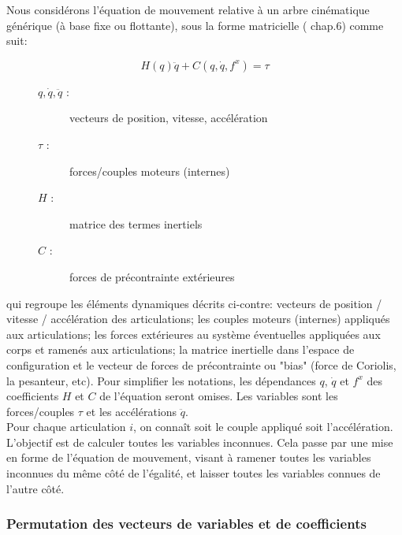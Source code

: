 \documentclass{report}
\begin{document}
Nous considérons l'équation de mouvement relative à un arbre cinématique générique (à base fixe ou flottante), sous la forme matricielle (\cite{bib_featherstone} chap.6) comme suit:

\begin{equation} \label{equ_equationMvt}
H(q)\ddot{q} + C(q,\dot{q},f^x) = \tau
\end{equation}

\medskip

\begin{figure}
  \begin{flushright}
  \begin{minipage}[t]{0.45\textwidth}
  \begin{description}
    \item[$q, \dot{q}, \ddot{q}$ :] vecteurs de position, vitesse, accélération
    \item[$\tau$ :] forces/couples moteurs (internes)
    \item[$H$ :] matrice des termes inertiels
    \item[$C$ :] forces de précontrainte extérieures
  \end{description}
  \end{minipage}
  \end{flushright}
\end{figure}

qui regroupe les éléments dynamiques décrits ci-contre: vecteurs de position / vitesse / accélération des articulations; les couples moteurs (internes) appliqués aux articulations; les forces extérieures au système éventuelles appliquées aux corps et ramenés aux articulations; la matrice inertielle dans l'espace de configuration et le vecteur de forces de précontrainte ou "bias" (force de Coriolis, la pesanteur, etc).
Pour simplifier les notations, les dépendances $q$, $\dot{q}$ et $f^x$ des coefficients $H$ et $C$ de l'équation seront omises. Les variables sont les forces/couples $\tau$ et les accélérations $\ddot{q}$.\\
Pour chaque articulation $i$, on connaît soit le couple appliqué soit l'accélération. L'objectif est de calculer toutes les variables inconnues. Cela passe par une mise en forme de l'équation de mouvement, visant à ramener toutes les variables inconnues du même côté de l'égalité, et laisser toutes les variables connues de l'autre côté.

\subsubsection{Permutation des vecteurs de variables et de coefficients}
\end{document}
